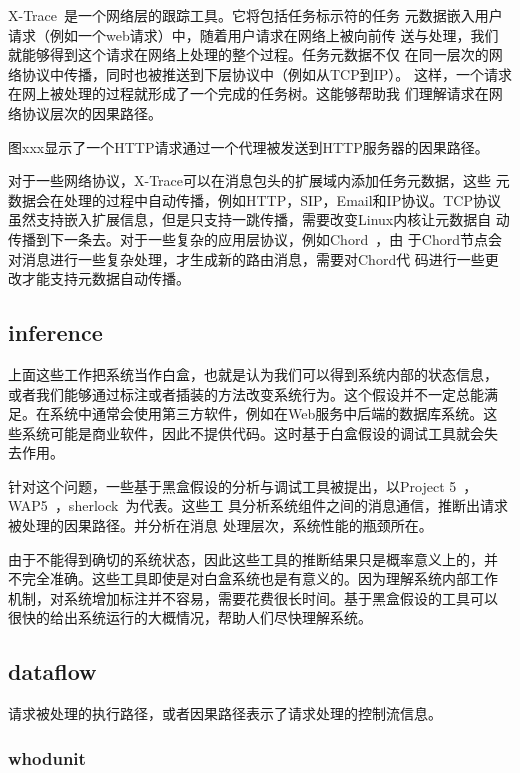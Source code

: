 X-Trace~\cite{x-trace}是一个网络层的跟踪工具。它将包括任务标示符的任务
元数据嵌入用户请求（例如一个web请求）中，随着用户请求在网络上被向前传
送与处理，我们就能够得到这个请求在网络上处理的整个过程。任务元数据不仅
在同一层次的网络协议中传播，同时也被推送到下层协议中（例如从TCP到IP）。
这样，一个请求在网上被处理的过程就形成了一个完成的任务树。这能够帮助我
们理解请求在网络协议层次的因果路径。

图xxx显示了一个HTTP请求通过一个代理被发送到HTTP服务器的因果路径。

对于一些网络协议，X-Trace可以在消息包头的扩展域内添加任务元数据，这些
元数据会在处理的过程中自动传播，例如HTTP，SIP，Email和IP协议。TCP协议
虽然支持嵌入扩展信息，但是只支持一跳传播，需要改变Linux内核让元数据自
动传播到下一条去。对于一些复杂的应用层协议，例如Chord~\cite{chord}，由
于Chord节点会对消息进行一些复杂处理，才生成新的路由消息，需要对Chord代
码进行一些更改才能支持元数据自动传播。

\subsection{inference}

上面这些工作把系统当作白盒，也就是认为我们可以得到系统内部的状态信息，
或者我们能够通过标注或者插装的方法改变系统行为。这个假设并不一定总能满
足。在系统中通常会使用第三方软件，例如在Web服务中后端的数据库系统。这
些系统可能是商业软件，因此不提供代码。这时基于白盒假设的调试工具就会失
去作用。

针对这个问题，一些基于黑盒假设的分析与调试工具被提出，以Project
5~\cite{p5}，WAP5~\cite{wap5}，sherlock~\cite{sherlock}为代表。这些工
具分析系统组件之间的消息通信，推断出请求被处理的因果路径。并分析在消息
处理层次，系统性能的瓶颈所在。

由于不能得到确切的系统状态，因此这些工具的推断结果只是概率意义上的，并
不完全准确。这些工具即使是对白盒系统也是有意义的。因为理解系统内部工作
机制，对系统增加标注并不容易，需要花费很长时间。基于黑盒假设的工具可以
很快的给出系统运行的大概情况，帮助人们尽快理解系统。

\subsection{dataflow}

请求被处理的执行路径，或者因果路径表示了请求处理的控制流信息。

\subsubsection*{whodunit}


